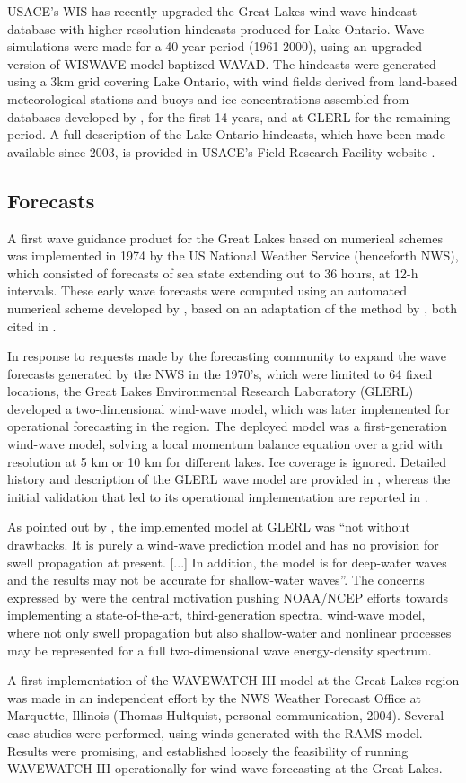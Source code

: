 USACE's WIS has recently upgraded the Great Lakes wind-wave hindcast database
with higher-resolution hindcasts produced for Lake Ontario. Wave simulations
were made for a 40-year period (1961-2000), using an upgraded version of WISWAVE
model baptized WAVAD. The hindcasts were generated using a 3km grid covering
Lake Ontario, with wind fields derived from land-based meteorological stations
and buoys and ice concentrations assembled from databases developed by
\cite{asset83}, for the first 14 years, and at GLERL for the remaining period. A
full description of the Lake Ontario hindcasts, which have been made available
since 2003, is provided in USACE's Field Research Facility website
\citep{wisweb}.

\subsection{Forecasts}

A first wave guidance product for the Great Lakes based on numerical schemes was
implemented in 1974 by the US National Weather Service (henceforth NWS), which
consisted of forecasts of sea state extending out to 36 hours, at 12-h
intervals. These early wave forecasts were computed using an automated numerical
scheme developed by \cite{pore74}, based on an adaptation of the method by
\cite{bret70}, both cited in \cite{burrdal97}. 

In response to requests made by the forecasting community to expand the wave
forecasts generated by the NWS in the 1970's, which were limited to 64 fixed
locations, the Great Lakes Environmental Research Laboratory (GLERL) developed a
two-dimensional wind-wave model, which was later implemented for operational
forecasting in the region. The deployed model was a first-generation wind-wave
model, solving a local momentum balance equation over a grid with resolution at
5 km or 10 km for different lakes. Ice coverage is ignored. Detailed history and
description of the GLERL wave model are provided in \cite{schwet84a,schwet84b},
whereas the initial validation that led to its operational implementation are
reported in \cite{liuet84}. 

As pointed out by \cite{liuet84}, the implemented model at GLERL was ``not
without drawbacks. It is purely a wind-wave prediction model and has no
provision for swell propagation at present. [...] In addition, the model is for
deep-water waves and the results may not be accurate for shallow-water waves''.
The concerns expressed by \cite{liuet84} were the central motivation pushing
NOAA/NCEP efforts towards implementing a state-of-the-art, third-generation
spectral wind-wave model, where not only swell propagation but also
shallow-water and nonlinear processes may be represented for a full
two-dimensional wave energy-density spectrum. 

A first implementation of the WAVEWATCH III model at the Great Lakes region was
made in an independent effort by the NWS Weather Forecast Office at Marquette,
Illinois (Thomas Hultquist, personal communication, 2004). Several case studies
were performed, using winds generated with the RAMS model. Results were
promising, and established loosely the feasibility of running WAVEWATCH III
operationally for wind-wave forecasting at the Great Lakes.
